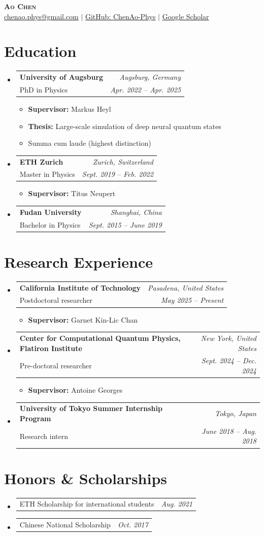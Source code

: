 \documentclass[a4paper,11pt]{article}
\makeatletter
\newcommand{\resumeItem}[1]{\item\small{#1 \vspace{-2pt}}}
\newcommand{\resumeSubheading}[4]{
  \vspace{-2pt}\item
    \begin{tabular*}{0.97\textwidth}[t]{l@{\extracolsep{\fill}}r}
      \textbf{#1} & \textit{\small #2} \\
      \small#3 & \textit{\small #4} \\
    \end{tabular*}\vspace{-7pt}
}
\newcommand{\resumeSingleLine}[2]{
  \vspace{-2pt}\item
    \begin{tabular*}{0.97\textwidth}[t]{l@{\extracolsep{\fill}}r}
      \small#1 & \textit{\small #2} \\
    \end{tabular*}\vspace{-7pt}
}
\newcommand{\resumeSubHeadingListStart}{\begin{itemize}[leftmargin=0.15in, label={}]}
\newcommand{\resumeSubHeadingListEnd}{\end{itemize}}
\newcommand{\resumeItemListStart}{\begin{itemize}}
\newcommand{\resumeItemListEnd}{\end{itemize}\vspace{-5pt}}
\makeatother
\begin{document}
\begin{center}
  \textbf{\Huge \scshape Ao Chen} \\ \vspace{4pt}
  \small \href{mailto:chenao.phys@gmail.com}{chenao.phys@gmail.com} $|$
  \href{https://github.com/ChenAo-Phys}{GitHub: ChenAo-Phys} $|$
  \href{https://scholar.google.com/citations?user=ZEzFjXsAAAAJ}{Google Scholar}
\end{center}

\section{Education}
  \resumeSubHeadingListStart
    \resumeSubheading
      {University of Augsburg}{Augsburg, Germany}
      {PhD in Physics}{Apr. 2022 -- Apr. 2025}
      \resumeItemListStart
        \resumeItem{\textbf{Supervisor:} Markus Heyl}
        \resumeItem{\textbf{Thesis:} Large-scale simulation of deep neural quantum states}
        \resumeItem{Summa cum laude (highest distinction)}
      \resumeItemListEnd
    \resumeSubheading
      {ETH Zurich}{Zurich, Switzerland}
      {Master in Physics}{Sept. 2019 -- Feb. 2022}
      \resumeItemListStart
        \resumeItem{\textbf{Supervisor:} Titus Neupert}
      \resumeItemListEnd
    \resumeSubheading
      {Fudan University}{Shanghai, China}
      {Bachelor in Physics}{Sept. 2015 -- June 2019}
  \resumeSubHeadingListEnd

\section{Research Experience}
  \resumeSubHeadingListStart
    \resumeSubheading
      {California Institute of Technology}{Pasadena, United States}
      {Postdoctoral researcher}{May 2025 -- Present}
      \resumeItemListStart
        \resumeItem{\textbf{Supervisor:} Garnet Kin-Lic Chan}
      \resumeItemListEnd
    \resumeSubheading
      {Center for Computational Quantum Physics, Flatiron Institute}{New York, United States}
      {Pre-doctoral researcher}{Sept. 2024 -- Dec. 2024}
      \resumeItemListStart
        \resumeItem{\textbf{Supervisor:} Antoine Georges}
      \resumeItemListEnd
    \resumeSubheading
      {University of Tokyo Summer Internship Program}{Tokyo, Japan}
      {Research intern}{June 2018 -- Aug. 2018}
  \resumeSubHeadingListEnd

\section{Honors \& Scholarships}
  \resumeSubHeadingListStart
    \resumeSingleLine{ETH Scholarship for international students}{Aug. 2021}
    \resumeSingleLine{Chinese National Scholarship}{Oct. 2017}
  \resumeSubHeadingListEnd
\end{document}
